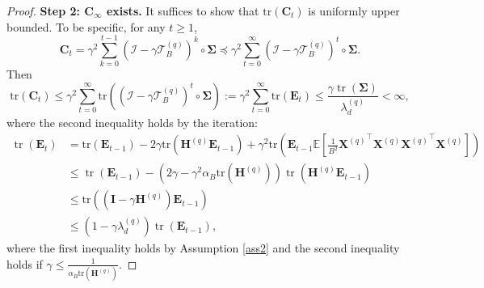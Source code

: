 \documentclass[11pt, letterpaper]{article}
\begin{document}
\begin{proof}
    \textbf{Step 2: $\mathbf{C}_\infty$ exists.}
    It suffices to show that $\mathrm{tr}(\mathbf{C}_t)$ is uniformly upper bounded. To be specific, for any $t\geq 1$,
    \begin{equation*}
        \mathbf{C}_t=\gamma^2\sum_{k=0}^{t-1}(\mathcal{I}-\gamma\mathcal{T}_B^{(q)})^k\circ\boldsymbol{\Sigma}\preceq\gamma^2\sum_{t=0}^\infty(\mathcal{I}-\gamma\mathcal{T}_B^{(q)})^t\circ\boldsymbol{\Sigma}.
    \end{equation*}
    Then
    \begin{equation*}
        \mathrm{tr}(\mathbf{C}_t)\leq\gamma^2\sum_{t=0}^\infty\mathrm{tr}\left((\mathcal{I}-\gamma\mathcal{T}_B^{(q)})^t\circ\boldsymbol{\Sigma}\right):=\gamma^2\sum_{t=0}^\infty\mathrm{tr}(\mathbf{E}_t)\leq\frac{\gamma\operatorname{tr}(\boldsymbol{\Sigma})}{\lambda_d^{(q)}}<\infty,
    \end{equation*}
    where the second inequality holds by the iteration:
    \begin{equation*}
        \begin{aligned}
            \operatorname{tr}(\mathbf{E}_{t}) & =\mathrm{tr}(\mathbf{E}_{t-1})-2\gamma\mathrm{tr}(\mathbf{H}^{(q)}\mathbf{E}_{t-1})+\gamma^{2}\mathrm{tr}\left(\mathbf{E}_{t-1}\mathbb{E}\left[\frac{1}{B^2} {\mathbf{X}^{(q)}}^\top{\mathbf{X}^{(q)}}{\mathbf{X}^{(q)}}^\top{\mathbf{X}^{(q)}} \right]\right) \\
            & \leq\operatorname{tr}(\mathbf{E}_{t-1})-(2\gamma-\gamma^{2}\alpha_B\mathrm{tr}(\mathbf{H}^{(q)}))\operatorname{tr}(\mathbf{H}^{(q)}\mathbf{E}_{t-1}) \\
            & \leq\mathrm{tr}\left((\mathbf{I}-\gamma\mathbf{H}^{(q)})\mathbf{E}_{t-1}\right) \\
            & \leq(1-\gamma\lambda_{d}^{(q)})\operatorname{tr}(\mathbf{E}_{t-1}),
        \end{aligned}
    \end{equation*} 
    where the first inequality holds by Assumption \ref{ass2} and the second inequality holds if $\gamma \leq \frac{1}{\alpha_B\mathrm{tr}(\mathbf{H}^{(q)})}$.


\end{proof}
\end{document}
